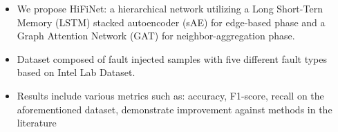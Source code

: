 \begin{itemize} 
  \item We propose HiFiNet: a hierarchical network utilizing a Long Short-Tern Memory (LSTM) stacked autoencoder (sAE) for edge-based phase and a Graph Attention Network (GAT) for neighbor-aggregation phase. 
  \item Dataset composed of fault injected samples with five different fault types based on Intel Lab Dataset. 
  \item Results include various metrics such as: accuracy, F1-score, recall on the aforementioned dataset, demonstrate improvement against methods in the literature \end{itemize}
